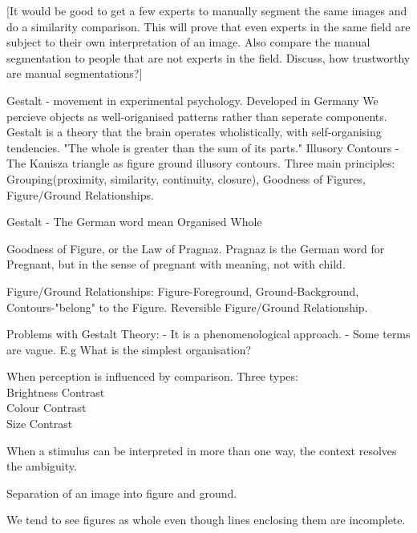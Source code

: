 [It would be good to get a few experts to manually segment the same images and do a similarity comparison. This will prove that even experts in the same field are subject to their own interpretation of an image. Also compare the manual segmentation to people that are not experts in the field. Discuss, how trustworthy are manual segmentations?]

Gestalt - movement in experimental psychology. Developed in Germany We percieve objects as well-origanised patterns rather than seperate components. Gestalt is a theory that the brain operates wholistically, with self-organising tendencies. "The whole is greater than the sum of its parts." Illusory Contours - The Kanisza triangle as figure ground illusory contours. Three main principles: Grouping(proximity, similarity, continuity, closure), Goodness of Figures, Figure/Ground Relationships.

Gestalt - The German word mean Organised Whole

Goodness of Figure, or the Law of Pragnaz. Pragnaz is the German word for Pregnant, but in the sense of pregnant with meaning, not with child.

Figure/Ground Relationships: Figure-Foreground, Ground-Background, Contours-"belong" to the Figure. Reversible Figure/Ground Relationship.

Problems with Gestalt Theory: 
- It is a phenomenological approach.
- Some terms are vague. E.g What is the simplest organisation?

\begin{definition}[Contrast]
	When perception is influenced by comparison. Three types:\\
	Brightness Contrast\\
	Colour Contrast\\
	Size Contrast
\end{definition}

\begin{definition}[Context]
	When a stimulus can be interpreted in more than one way, the context resolves the ambiguity.
\end{definition}

\begin{definition}
	Separation of an image into figure and ground.
\end{definition}

\begin{definition}[Closure]
	We tend to see figures as whole even though lines enclosing them are incomplete.
\end{definition}

